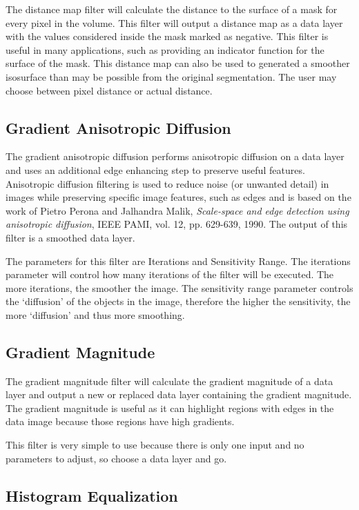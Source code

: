 \documentclass[fleqn,11pt,openany]{book}
\begin{document}
The distance map filter will calculate the distance to the surface of a mask  for every pixel in the volume.  This filter will output a distance map as a data layer with the values considered inside the mask marked as negative.  This filter is useful in many applications, such as providing an indicator function for the surface of the mask.  This distance map can also be used to generated a smoother isosurface than may be possible from the original segmentation.  The user may choose between pixel distance or actual distance.  

\subsection{Gradient Anisotropic Diffusion}

The gradient anisotropic diffusion performs anisotropic diffusion on a data layer and uses an additional edge enhancing step to preserve useful features.  Anisotropic diffusion filtering is used to reduce noise (or unwanted detail) in images while preserving specific image features, such as edges and is based on the work of Pietro Perona and Jalhandra Malik, \emph{Scale-space and edge detection using anisotropic diffusion}, IEEE PAMI, vol. 12, pp. 629-639, 1990.  The output of this filter is a smoothed data layer.

The parameters for this filter are Iterations and Sensitivity Range.  The iterations parameter will control how many iterations of the filter will be executed.  The more iterations, the smoother the image.  The sensitivity range parameter controls the `diffusion' of the objects in the image, therefore the higher the sensitivity, the more `diffusion' and thus more smoothing. 

\subsection{Gradient Magnitude}

The gradient magnitude filter will calculate the gradient magnitude of a data layer and output a new or replaced data layer containing the gradient magnitude.   The gradient magnitude is useful as it can highlight regions with edges in the data image because those regions have high gradients.  

This filter is very simple to use because there is only one input and no parameters to adjust, so choose a data layer and go.

\subsection{Histogram Equalization}
\end{document}
